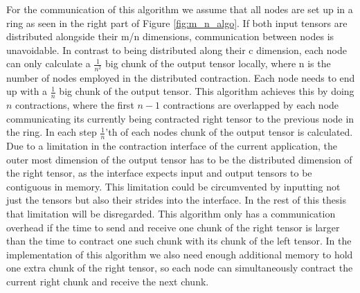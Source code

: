 For the communication of this algorithm we assume that all nodes are set up in a ring as seen in the right part of Figure \ref{fig:m_n_algo}.
If both input tensors are distributed alongside their m/n dimensions, communication between nodes is unavoidable.
In contrast to being distributed along their c dimension, each node can only calculate a $\frac{1}{n^2}$ big chunk of the output tensor locally, where n is the number of nodes employed in the distributed contraction.
Each node needs to end up with a $\frac{1}{n}$ big chunk of the output tensor.
This algorithm achieves this by doing $n$ contractions, where the first $n-1$ contractions are overlapped by each node communicating its currently being contracted right tensor to the previous node in the ring.
In each step $\frac{1}{n}$'th of each nodes chunk of the output tensor is calculated.
Due to a limitation in the contraction interface of the current application, the outer most dimension of the output tensor has to be the distributed dimension of the right tensor, as the interface expects input and output tensors to be contiguous in memory.
This limitation could be circumvented by inputting not just the tensors but also their strides into the interface.
In the rest of this thesis that limitation will be disregarded.
This algorithm only has a communication overhead if the time to send and receive one chunk of the right tensor is larger than the time to contract one such chunk with its chunk of the left tensor.
In the implementation of this algorithm we also need enough additional memory to hold one extra chunk of the right tensor, so each node can simultaneously contract the current right chunk and receive the next chunk.

